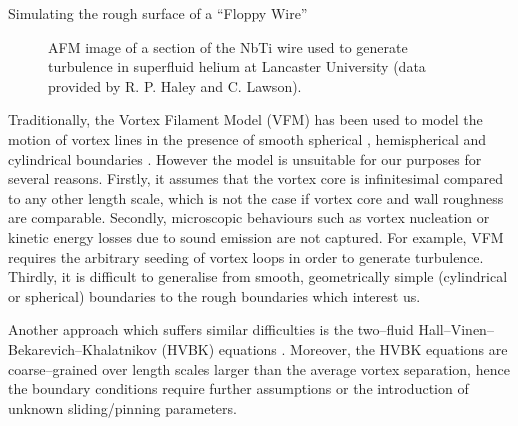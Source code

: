 \begin{chapter}{\label{cha:afm}Simulating the rough surface of a ``Floppy Wire''}
\begin{figure}
  \centering
  \caption{\label{fig:afmreal}AFM image of a section of the NbTi wire used to generate turbulence in superfluid helium at Lancaster University (data provided by R. P. Haley and C. Lawson).}
\end{figure}

Traditionally, the Vortex Filament Model (VFM) \cite{Schwarz}
has been used to model the motion of vortex lines in the presence of
smooth spherical \cite{Hanninen-sphere,Kivotides-sphere},
hemispherical \cite{Schwarz-bump,PhysRevB.50.579} 
and cylindrical boundaries \cite{Hanninen-PNAS,goto08}.
However the model is unsuitable for our purposes for several reasons.
Firstly, it assumes that the vortex core is infinitesimal compared to 
any other length scale, which is not the case if
vortex core and wall roughness are comparable.
Secondly, microscopic behaviours such as vortex nucleation or kinetic energy losses due
to sound emission are not captured. For example, VFM requires the arbitrary seeding of
vortex loops in order to generate turbulence.
Thirdly, it is difficult to generalise from smooth, geometrically simple (cylindrical or spherical)
boundaries to the rough boundaries which interest us.

Another approach which suffers similar difficulties \cite{Henderson} is
the two--fluid Hall--Vinen--Bekarevich--Khalatnikov (HVBK)
equations \cite{Salort2011,Salort2012}. Moreover, the HVBK equations are coarse--grained over
length scales larger than the average vortex separation, hence the
boundary conditions require further assumptions or the introduction of
unknown sliding/pinning parameters.



\end{chapter}
